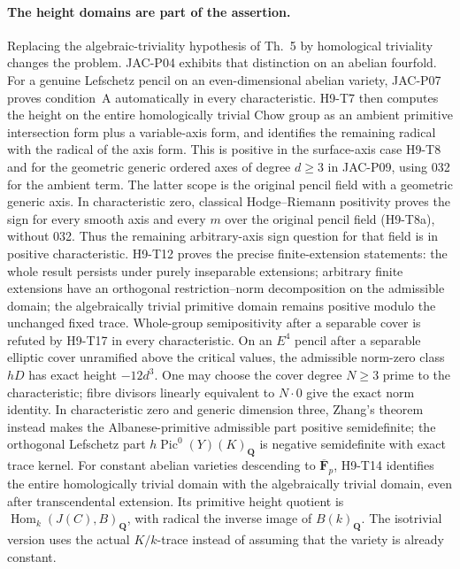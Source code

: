 \paragraph{The height domains are part of the assertion.}
Replacing the algebraic-triviality hypothesis of Th.~5 by
homological triviality changes the problem. JAC-P04 exhibits that
distinction on an abelian fourfold. For a genuine Lefschetz pencil
on an even-dimensional abelian variety, JAC-P07 proves condition~A
automatically in every characteristic. H9-T7 then computes the
height on the entire homologically trivial Chow group as an
ambient primitive intersection form plus a variable-axis form,
and identifies the remaining radical with the radical of the axis
form. This is positive in the surface-axis case
H9-T8 and for the geometric generic ordered axes of degree
$d\ge3$ in JAC-P09, using 032 for the ambient term. The latter
scope is the original pencil field with a geometric generic axis.
In characteristic zero, classical Hodge--Riemann positivity proves
the sign for every smooth axis and every $m$ over the original
pencil field (H9-T8a), without 032. Thus the remaining arbitrary-axis
sign question for that field is in positive characteristic.
H9-T12 proves the precise finite-extension statements: the whole
result persists under purely inseparable extensions; arbitrary
finite extensions have an orthogonal restriction--norm
decomposition on the admissible domain; the algebraically trivial
primitive domain remains positive modulo the unchanged fixed trace.
Whole-group semipositivity after a separable cover is refuted by
H9-T17 in every characteristic. On an $E^4$ pencil after a
separable elliptic cover unramified above the critical values,
the admissible norm-zero class $hD$ has exact height $-12d^3$.
One may choose the cover degree $N\ge3$ prime to the
characteristic; fibre divisors linearly equivalent to $N\cdot0$
give the exact norm identity. In characteristic zero and generic
dimension three, Zhang's theorem instead makes the
Albanese-primitive admissible part positive semidefinite; the
orthogonal Lefschetz part $h\operatorname{Pic}^0(Y)(K)_{\mathbf Q}$
is negative semidefinite with exact trace kernel.
For constant abelian varieties descending to
$\overline{\mathbf F}_p$, H9-T14 identifies the entire homologically
trivial domain with the algebraically trivial domain, even after
transcendental extension. Its primitive height quotient is
$\operatorname{Hom}_k(J(C),B)_{\mathbf Q}$, with radical the
inverse image of $B(k)_{\mathbf Q}$. The isotrivial version uses
the actual $K/k$-trace instead of assuming that the variety is
already constant.

